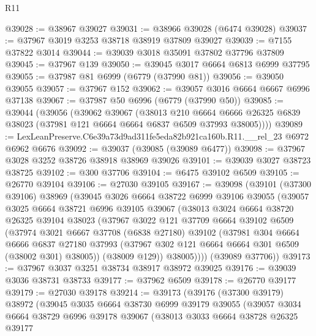 \begin{lexlean}{R11}
\begin{coremodule}
@39028 := @38967 @39027
@39031 := @38966 @39028 (@6474 @39028)
@39037 := @37967 @3019 @3253 @38718 @38919 @37809 @39027
@39039 := @7155 @37822 @3014
@39044 := @39039 @3018 @35091 @37802 @37796 @37809
@39045 := @37967 @139
@39050 := @39045 @3017 @6664 @6813 @6999 @37795
@39055 := @37987 @81 @6999 (@6779 (@37990 @81))
@39056 := @39050 @39055
@39057 := @37967 @152
@39062 := @39057 @3016 @6664 @6667 @6996 @37138
@39067 := @37987 @50 @6996 (@6779 (@37990 @50))
@39085 := @39044
    (@39056
      (@39062
        @39067
        (@38013
          @210
          @6664
          @6666
          @26325
          @6839
          @38023
          (@37981 @121 @6664 @6664 @6837 @6509 @37993 @38005))))
@39089 := LexLeanPreserve.C6e39a73d9ad311fe5eda82b921ca160b.R11.__rel_23 @6972 @6962 @6676
@39092 := @39037 (@39085 (@39089 @6477))
@39098 := @37967 @3028 @3252 @38726 @38918 @38969 @39026
@39101 := @39039 @3027 @38723 @38725
@39102 := @300 @37706
@39104 := @6475 @39102 @6509
@39105 := @26770 @39104
@39106 := @27030 @39105
@39167 := @39098
    (@39101
      (@37300 @39106)
      @38969
      (@39045
        @3026
        @6664
        @38722
        @6999
        @39106
        @39055
        (@39057
          @3025
          @6664
          @38721
          @6996
          @39105
          @39067
          (@38013
            @3024
            @6664
            @38720
            @26325
            @39104
            @38023
            (@37967
              @3022
              @121
              @37709
              @6664
              @39102
              @6509
              (@37974
                @3021
                @6667
                @37708
                (@6838 @27180)
                @39102
                (@37981
                  @304
                  @6664
                  @6666
                  @6837
                  @27180
                  @37993
                  (@37967 @302 @121 @6664 @6664 @301 @6509 (@38002 @301) @38005))
                (@38009 @129))
              @38005))))
      (@39089 @37706))
@39173 := @37967 @3037 @3251 @38734 @38917 @38972 @39025
@39176 := @39039 @3036 @38731 @38733
@39177 := @37962 @6509
@39178 := @26770 @39177
@39179 := @27030 @39178
@39214 := @39173
    (@39176
      (@37300 @39179)
      @38972
      (@39045
        @3035
        @6664
        @38730
        @6999
        @39179
        @39055
        (@39057
          @3034
          @6664
          @38729
          @6996
          @39178
          @39067
          (@38013
            @3033
            @6664
            @38728
            @26325
            @39177

\end{coremodule}
\end{lexlean}
